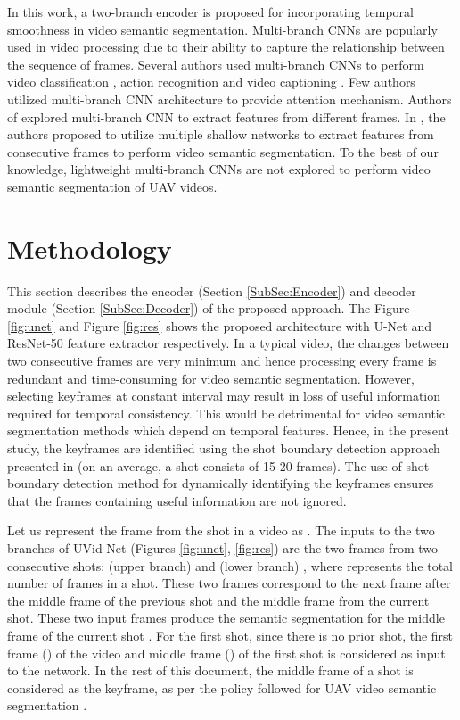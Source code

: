 \documentclass[journal]{IEEEtran}
\begin{document}
In this work, a two-branch encoder is proposed for incorporating temporal smoothness in video semantic segmentation. Multi-branch CNNs are popularly used in video processing due to their ability to capture the relationship between the sequence of frames. Several authors used multi-branch CNNs to perform video classification \cite{wang2018appearance}, action recognition \cite{peng2016multi} and video captioning \cite{yu2016video}. Few authors utilized multi-branch CNN architecture to provide attention mechanism. Authors of \cite{qiao2016deep} explored multi-branch CNN to extract features from different frames. In \cite{hu2020temporally}, the authors proposed to utilize multiple shallow networks to extract features from consecutive frames to perform video semantic segmentation. To the best of our knowledge, lightweight multi-branch CNNs are not explored to perform video semantic segmentation of UAV videos.  

\section{Methodology}
\label{sec:methodology}


\par This section describes the encoder (Section \ref{SubSec:Encoder}) and decoder module (Section \ref{SubSec:Decoder}) of the proposed approach.  The Figure \ref{fig:unet} and  Figure \ref{fig:res} shows the proposed architecture with U-Net and ResNet-50 feature extractor respectively. In a typical video, the changes between two consecutive frames are very minimum and hence processing every frame is redundant and time-consuming for video semantic segmentation. However,  selecting keyframes at constant interval may result in loss of useful information required for temporal consistency. This would be detrimental for video semantic segmentation methods which depend on temporal features. Hence, in the present study, the keyframes are identified using the shot boundary detection approach presented in \cite{19} (on an average, a shot consists of 15-20 frames). The use of shot boundary detection method for dynamically identifying the keyframes ensures that the frames containing useful information are not ignored.

\par Let us represent the  frame from the  shot in a video as . The inputs to the two branches of UVid-Net (Figures \ref{fig:unet}, \ref{fig:res}) are the two frames from two consecutive shots:  (upper branch) and  (lower branch) , where  represents the total number of frames in a shot. These two frames correspond to the next frame after the middle frame of the previous shot   and the middle frame from the current shot. These two input frames produce the semantic segmentation for the middle frame of the current shot   . For the first shot, since there is no prior shot, the first frame () of the video and middle frame () of the first shot is considered as input to  the network.
In the rest of this document, the middle frame of a shot is considered as the keyframe, as per the policy followed for UAV video semantic segmentation \cite{19}.
\end{document}
